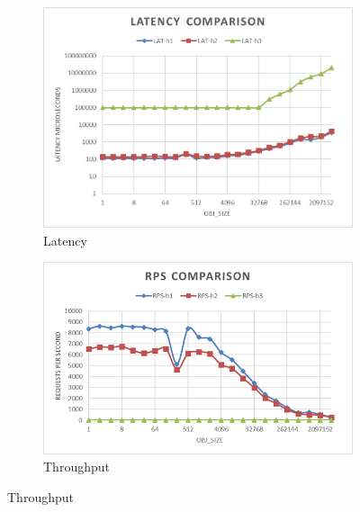 \documentclass[runningheads]{llncs}
\begin{document}
\begin{figure}[!bt]
    \centering
  \begin{subfigure}[t]{0.49\textwidth}
        \includegraphics[width=1\textwidth]{lat-h2load-mistral.png}\vspace{-0.5em}
        \caption{Latency}		
        \label {fig:lat-comp-mistral}
  \end{subfigure}
  \begin{subfigure}[t]{0.49\textwidth}
\includegraphics[width=1\textwidth]{rps-h2load-mistral.png}\vspace{-0.5em}
        \caption{Throughput}
		\label {fig:rps-comp-mistral}
  \end{subfigure}


\end{figure}
\end{document}
